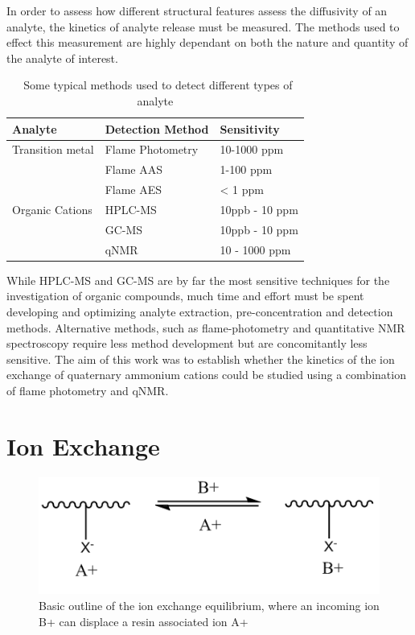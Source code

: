\documentclass[twoside,twocolumn,9pt]{article}
\begin{document}
In order to assess how different structural features assess the diffusivity of an analyte, the kinetics of analyte release must be measured. The methods used to effect this measurement are highly dependant on both the nature and quantity of the analyte of interest. 

\begin{table}[h]
\small
  \caption{\ Some typical methods used to detect different types of analyte}
  \label{tbl:example}
  \begin{tabular*}{0.48\textwidth}{@{\extracolsep{\fill}}lll}
    \hline
    Analyte & Detection Method & Sensitivity \\
    \hline
    Transition metal & Flame Photometry & 10-1000 ppm\\
                     & Flame AAS        & 1-100 ppm\\
                     & Flame AES        & < 1 ppm \\
    Organic Cations  & HPLC-MS          & 10ppb - 10 ppm\\
                     & GC-MS            & 10ppb - 10 ppm\\
                     & qNMR             & 10 - 1000 ppm\\
                     \hline
  \end{tabular*}
\end{table}

While HPLC-MS and GC-MS are by far the most sensitive techniques for the investigation of organic compounds, much time and effort must be spent developing and optimizing analyte extraction, pre-concentration and detection methods. Alternative methods, such as flame-photometry and quantitative NMR spectroscopy require less method development but are concomitantly less sensitive. The aim of this work was to establish whether the kinetics of the ion exchange of quaternary ammonium cations could be studied using a combination of flame photometry and qNMR.

\section{Ion Exchange}
\begin{figure}[h !]
	\includegraphics[width=.5\textwidth]{images/ion_exchange}
	\caption{Basic outline of the ion exchange equilibrium, where an incoming ion B+ can displace a resin associated ion A+ }
	\label{fig:ion_ex}
\end{figure}
\end{document}
